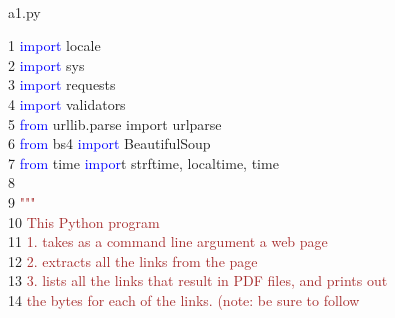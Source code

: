 \vspace*{5mm}
\\
\begin{center}
	a1.py\\
	\hdashrule{15cm}{1pt}{1pt}
\end{center}
1	 \hspace*{5mm}\textcolor{blue}{import} locale\\
2	 \hspace*{5mm}\textcolor{blue}{import} sys\\
3	 \hspace*{5mm}\textcolor{blue}{import} requests\\
4	 \hspace*{5mm}\textcolor{blue}{import} validators\\
5	 \hspace*{5mm}\textcolor{blue}{from} urllib.parse import urlparse\\
6	 \hspace*{5mm}\textcolor{blue}{from} bs4 \textcolor{blue}{import} BeautifulSoup\\
7	 \hspace*{5mm}\textcolor{blue}{from} time \textcolor{blue}{impor}t strftime, localtime, time\\
8	 \hspace*{5mm}\\
9	 \hspace*{5mm}\textcolor{brown}{"""}\\
10	 \hspace*{5mm}\textcolor{brown}{This Python program}\\
11	 \hspace*{5mm}  \hspace*{2.5mm}\textcolor{brown}{1. takes as a command line argument a web page}\\
12	 \hspace*{5mm}  \hspace*{2.5mm}\textcolor{brown}{2. extracts all the links from the page}\\
13	 \hspace*{5mm}  \hspace*{2.5mm}\textcolor{brown}{3. lists all the links that result in PDF files, and prints out}\\
14	 \hspace*{5mm}     \hspace*{6.25mm}\textcolor{brown}{the bytes for each of the links.  \hspace*{2.5mm}(note: be sure to follow}\\
